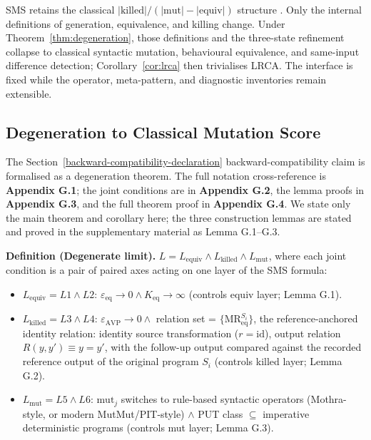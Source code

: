 \documentclass[review,12pt,authoryear]{elsarticle}
\providecommand{\tightlist}{\setlength{\itemsep}{0pt}\setlength{\parskip}{0pt}}
\begin{document}
SMS retains the classical
\(\lvert\mathrm{killed}\rvert/
(\lvert\mathrm{mut}\rvert-\lvert\mathrm{equiv}\rvert)\) structure
\citep{d7c38286734419b52de4262c9802ebdfcf4b9447}. Only the internal
definitions of generation, equivalence, and killing change. Under
Theorem~\ref{thm:degeneration}, those definitions and the three-state
refinement collapse to classical syntactic mutation, behavioural
equivalence, and same-input difference detection; Corollary~\ref{cor:lrca}
then trivialises LRCA. The interface is fixed while the operator,
meta-pattern, and diagnostic inventories remain extensible.

\subsection{Degeneration to Classical Mutation Score}\label{sms-ms-degeneration-formal-statement}

The Section~\ref{backward-compatibility-declaration} backward-compatibility claim is formalised as a degeneration
theorem. The full notation cross-reference is \textbf{Appendix G.1}; the joint
conditions are in \textbf{Appendix G.2}, the lemma proofs in
\textbf{Appendix G.3}, and the full theorem proof in \textbf{Appendix G.4}. We
state only the main theorem and corollary here; the three construction
lemmas are stated and proved in the supplementary material as
Lemma G.1--G.3.

\textbf{Definition (Degenerate limit).}
$L = L_{\mathrm{equiv}} \wedge L_{\mathrm{killed}} \wedge L_{\mathrm{mut}}$, where each joint
condition is a pair of paired axes acting on one layer of the SMS
formula:

\begin{itemize}
\tightlist
\item
  $L_{\mathrm{equiv}} = L1 \wedge L2$: $\varepsilon_{\mathrm{eq}} \to 0 \wedge K_{\mathrm{eq}} \to \infty$ (controls equiv
  layer; Lemma G.1).
\item
  $L_{\mathrm{killed}} = L3 \wedge L4$: $\varepsilon_{\mathrm{AVP}} \to 0 \wedge$ relation set =
  $\{\mathrm{MR}_{\mathrm{eq}}^{S_i}\}$, the reference-anchored identity
  relation: identity source transformation ($r = \mathrm{id}$), output
  relation $R(y,y') \equiv y = y'$, with the follow-up output compared
  against the recorded reference output of the original program $S_i$
  (controls killed layer; Lemma G.2).
\item
  $L_{\mathrm{mut}} = L5 \wedge L6$: $\mathrm{mut}_j$ switches to rule-based syntactic
  operators (Mothra-style, or modern MutMut/PIT-style) $\wedge$ PUT class $\subseteq$ imperative deterministic
  programs (controls mut layer; Lemma G.3).
\end{itemize}
\end{document}
